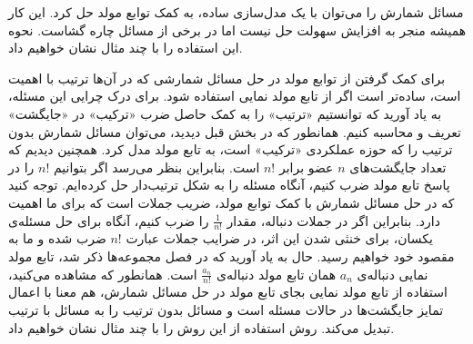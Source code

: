 \p
مسائل شمارش را می‌توان با یک مدل‌سازی ساده، به کمک توابع مولد حل کرد.
این کار همیشه منجر به افزایش سهولت حل نیست اما در برخی از مسائل چاره گشاست.
نحوه این استفاده را با چند مثال نشان خواهیم داد.






\p
برای کمک گرفتن از توابع مولد در حل مسائل شمارشی که در آن‌ها ترتیب با اهمیت است،
ساده‌تر است اگر از تابع مولد نمایی استفاده شود.
\p
برای درک چرایی این مسئله، به یاد آورید که توانستیم
«ترتیب»
را به کمک حاصل ضرب
«ترکیب»
در
«جایگشت»
تعریف و محاسبه کنیم.
همانطور که در بخش قبل دیدید، می‌توان مسائل شمارش بدون ترتیب
را که حوزه عملکردی
«ترکیب»
است، به تابع مولد مدل کرد.
همچنین دیدیم که
تعداد جایگشت‌های
$n$ عضو
برابر $n!$
است.
بنابراین بنظر می‌رسد اگر بتوانیم
$n!$
را در پاسخ تابع مولد ضرب کنیم، آنگاه مسئله را به شکل ترتیب‌دار حل کرده‌ایم.
توجه کنید که در حل مسائل شمارش با کمک توابع مولد، ضریب جملات است که برای ما اهمیت دارد. بنابراین اگر در جملات
دنباله‌، مقدار
$\frac{1}{n!}$
را ضرب کنیم، آنگاه برای حل مسئله‌ی یکسان، برای خنثی شدن این اثر، در ضرایب جملات عبارت
$n!$
ضرب شده و ما به مقصود خود خواهیم رسید.
حال به یاد آورید که در فصل مجموعه‌ها ذکر شد، تابع مولد نمایی دنباله‌ی
$a_n$
همان تابع مولد دنباله‌ی
$\frac{a_n}{n!}$
است.
\p
همانطور که مشاهده می‌کنید، استفاده از تابع مولد نمایی بجای تابع مولد در حل مسائل شمارش، هم معنا با اعمال تمایز
جایگشت‌ها در حالات مسئله است و مسائل بدون ترتیب را به مسائل با ترتیب تبدیل می‌کند.
\p
روش استفاده از این روش را با چند مثال نشان خواهیم داد.



